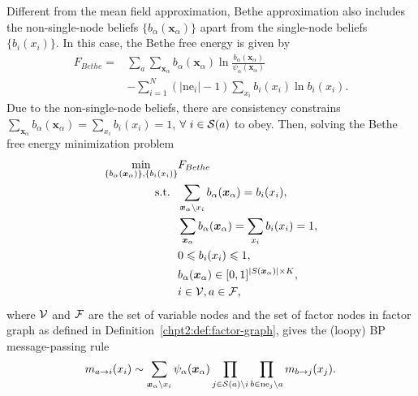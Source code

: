 Different from the mean field approximation, Bethe approximation also includes the non-single-node beliefs $\{b_{\alpha}(\bm{x}_{\alpha})\}$ apart from the single-node beliefs $\{b_i(x_i)\}$\cite{yedidia2003understanding}. In this case, the Bethe free energy is given by
\begin{align}\label{apdix:bethe-free-energy}
  F_{Bethe} = &\sum_{a} \sum_{\bm{x}_{\alpha}}
                b_{\alpha}(\bm{x}_{\alpha})\ln{\frac{b_{\alpha}(\bm{x}_{\alpha})}{\psi_{\alpha}(\bm{x}_{\alpha})}
                } \nonumber \\
              & -  \sum_{i=1}^{N} (|\mathrm{ne}_i| - 1) \sum_{x_i} b_i(x_i) \ln{b_i(x_i)}.
\end{align}
Due to the  non-single-node beliefs, there are consistency constrains $\sum_{\bm{x}_{\alpha}} b_{\alpha}(\bm{x}_{\alpha}) = \sum_{ x_i} b_i({x}_i) =1$, $\forall~ i \in \mathcal{S}(a)$ to obey. Then, solving the Bethe free energy minimization problem
\begin{align}
  \min_{\{b_{\alpha}(\bm{x}_{\alpha})\}, \{b_i(x_i)\}}& F_{Bethe} \nonumber \\
  \mathrm{s.t.}~~ & \sum_{\bm{x}_{\alpha} \backslash x_i} b_{\alpha}(\bm{x}_{\alpha})  =
                    b_i(x_i), \nonumber \\
                                                      & \sum_{\bm{x}_{\alpha}} b_{\alpha}(\bm{x}_{\alpha}) = \sum_{ x_i} b_i({x}_i) =1,
                                                        \nonumber \\
                                                      &  0 \leqslant b_i(x_i) \leqslant 1,  \nonumber \\
                                                      &  b_{\alpha}(\bm{x}_{\alpha}) \in [0,1]^{|S(\bm{x}_{\alpha})|\times K}, \nonumber \\
                                                      & i \in \mathcal{V} , a \in \mathcal{F},
\end{align}
where $\mathcal{V}$ and $\mathcal{F}$ are the set of variable nodes and the set of
factor nodes in factor graph as defined in
Definition~\ref{chpt2:def:factor-graph}, gives the (loopy) BP message-passing rule
\begin{equation}
  m_{a\rightarrow i}(x_i) \sim \sum_{\bm{x}_{\alpha} \backslash x_i}
  \psi_{\alpha}(\bm{x}_{\alpha}) \prod_{j \in \mathcal{S}(a) \backslash i} \prod_{b \in \mathrm{ne}_j
    \backslash a} m_{b\rightarrow j}(x_j).
\end{equation}


